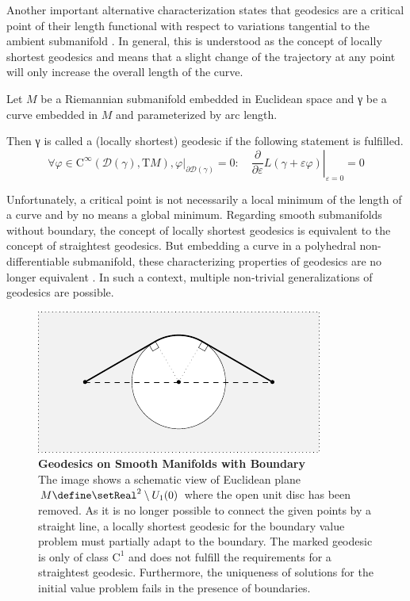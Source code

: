 \documentclass{stdlocal}
\begin{document}
  Another important alternative characterization states that geodesics are a critical point of their length functional with respect to variations tangential to the ambient submanifold \autocite{polthier2006}.
  In general, this is understood as the concept of locally shortest geodesics and means that a slight change of the trajectory at any point will only increase the overall length of the curve.

  \begin{definition}
    Let $M$ be a Riemannian submanifold embedded in Euclidean space and γ be a curve embedded in $M$ and parameterized by arc length.

    Then γ is called a (locally shortest) geodesic if the following statement is fulfilled.
    \[
      \forall φ\in\mathrm{C}^\infty(\mathscr{D}(γ),\mathrm{T}M), φ\vert_{\partial\mathscr{D}(γ)} = 0 \colon\quad
      \left.\frac{\partial}{\partial ε}L(γ + εφ)\right|_{ε=0} = 0
    \]
  \end{definition}
  Unfortunately, a critical point is not necessarily a local minimum of the length of a curve and by no means a global minimum.
  Regarding smooth submanifolds without boundary, the concept of locally shortest geodesics is equivalent to the concept of straightest geodesics.
  But embedding a curve in a polyhedral non-differentiable submanifold, these characterizing properties of geodesics are no longer equivalent \autocite{polthier2006}.
  In such a context, multiple non-trivial generalizations of geodesics are possible.

  \begin{figure}[t]
    \centering
    \includegraphics[width=0.8\linewidth]{figures/geodesic-on-boundary-smooth.pdf}
    \caption[Geodesics on Smooth Manifolds with Boundary]{%
      \textbf{Geodesics on Smooth Manifolds with Boundary}\\
      The image shows a schematic view of Euclidean plane $M\define \setReal^2\setminus U_1(0)$ where the open unit disc has been removed.
      As it is no longer possible to connect the given points by a straight line, a locally shortest geodesic for the boundary value problem must partially adapt to the boundary.
      The marked geodesic is only of class $\mathrm{C}^1$ and does not fulfill the requirements for a straightest geodesic.
      Furthermore, the uniqueness of solutions for the initial value problem fails in the presence of boundaries.
    }
    \label{fig:geodesic-on-manifold-with-boundary-smooth}
  \end{figure}
\end{document}
